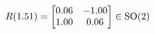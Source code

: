 \documentclass[preview]{standalone}
\begin{document}
\begin{align*}
\special{dvisvgm:raw <g id='unique000'>}R(1.51) = \begin{bmatrix} 0.06 & -1.00 \\ 1.00 & 0.06 \end{bmatrix} \in \text{SO}(2)\special{dvisvgm:raw </g>}
\end{align*}
\end{document}
